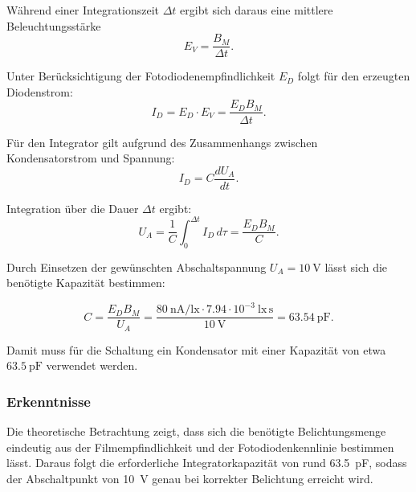 Während einer Integrationszeit \(\Delta t\) ergibt sich daraus eine mittlere Beleuchtungsstärke
\begin{equation}
	E_V = \frac{B_M}{\Delta t}.
\end{equation}

Unter Berücksichtigung der Fotodiodenempfindlichkeit \(E_D\) folgt für den erzeugten Diodenstrom:
\begin{equation}
	I_D = E_D \cdot E_V = \frac{E_D B_M}{\Delta t}.
\end{equation}

Für den Integrator gilt aufgrund des Zusammenhangs zwischen Kondensatorstrom und Spannung:
\begin{equation}
	I_D = C \frac{dU_A}{dt}.
\end{equation}

Integration über die Dauer \(\Delta t\) ergibt:
\begin{equation}
	U_A = \frac{1}{C} \int_0^{\Delta t} I_D\, d\tau = \frac{E_D B_M}{C}.
\end{equation}

Durch Einsetzen der gewünschten Abschaltspannung \(U_A = \SI{10}{\volt}\) lässt sich die benötigte Kapazität bestimmen:

\begin{equation}
	C = \frac{E_D B_M}{U_A}
	= \frac{80~\mathrm{nA/lx} \cdot 7.94\cdot 10^{-3}~\mathrm{lx\,s}}
	{10~\mathrm{V}}
	= 63.54~\mathrm{pF}.
\end{equation}

Damit muss für die Schaltung ein Kondensator mit einer Kapazität von etwa \(\SI{63.5}{\pico\farad}\) verwendet werden.

\subsubsection{Erkenntnisse}

Die theoretische Betrachtung zeigt, dass sich die benötigte Belichtungsmenge eindeutig aus der Filmempfindlichkeit und der Fotodiodenkennlinie bestimmen lässt. Daraus folgt die erforderliche Integratorkapazität von rund \SI{63.5}{\pico\farad}, sodass der Abschaltpunkt von \SI{10}{\volt} genau bei korrekter Belichtung erreicht wird.



